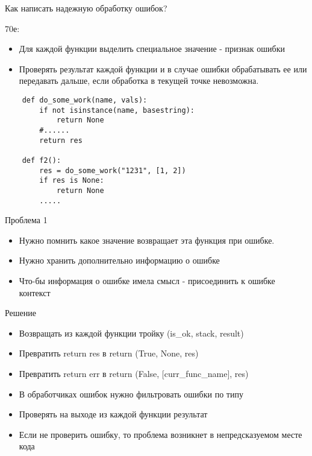 \documentclass{article}
\begin{document}
\LARGE

\begin{center} Как написать надежную обработку ошибок? \end{center}
70е:
\begin{itemize}
	\item Для каждой функции выделить специальное значение - признак ошибки
	\item Проверять результат каждой функции и в случае ошибки обрабатывать
	        ее или передавать дальше, если обработка в текущей точке невозможна.
\end{itemize}
\begin{lstlisting}
	def do_some_work(name, vals):
		if not isinstance(name, basestring):
			return None
		#......
		return res

	def f2():
		res = do_some_work("1231", [1, 2])
		if res is None:
			return None
		.....
\end{lstlisting}
\newpage

\begin{center} Проблема 1 \end{center}
\begin{itemize}
	\item Нужно помнить какое значение возвращает эта функция при ошибке.
	\item Нужно хранить дополнительно информацию о ошибке
	\item Что-бы информация о ошибке имела смысл - присоединить к ошибке контекст
\end{itemize}
\newpage

\begin{center} Решение \end{center}
\begin{itemize}
	\item Возвращать из каждой функции тройку (is\_ok, stack, result)
	\item Превратить return res в return (True, None, res)
	\item Превратить return err в return (False, [curr\_func\_name], res)
	\item В обработчиках ошибок нужно фильтровать ошибки по типу
	\item Проверять на выходе из каждой функции результат
	\item Если не проверить ошибку, то проблема 
			возникнет в непредсказуемом месте кода
\end{itemize}
\newpage
\end{document}
